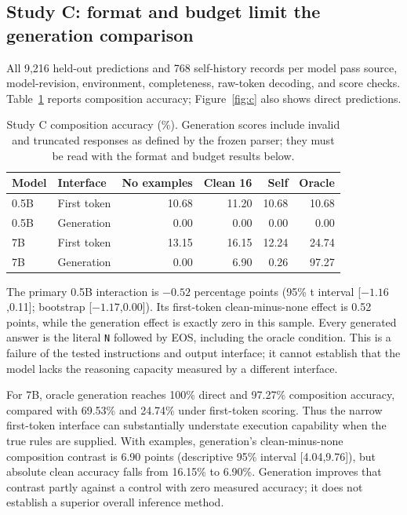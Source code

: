 \documentclass[11pt]{article}
\begin{document}
\subsection{Study C: format and budget limit the generation comparison}
All 9,216 held-out predictions and 768 self-history records per model pass
source, model-revision, environment, completeness, raw-token decoding, and
score checks. Table~\ref{tab:c} reports composition accuracy; Figure~\ref{fig:c}
also shows direct predictions.

\begin{table}[htbp]
\centering\small
\begin{tabular}{llrrrr}
\toprule
Model & Interface & No examples & Clean 16 & Self & Oracle \\
\midrule
0.5B & First token & 10.68 & 11.20 & 10.68 & 10.68 \\
0.5B & Generation & 0.00 & 0.00 & 0.00 & 0.00 \\
7B & First token & 13.15 & 16.15 & 12.24 & 24.74 \\
7B & Generation & 0.00 & 6.90 & 0.26 & 97.27 \\
\bottomrule
\end{tabular}
\caption{Study C composition accuracy (\%). Generation scores include invalid
and truncated responses as defined by the frozen parser; they must be read
with the format and budget results below.}
\label{tab:c}
\end{table}

The primary 0.5B interaction is $-0.52$ percentage points (95\% t interval
[$-1.16$,0.11]; bootstrap [$-1.17$,0.00]). Its first-token clean-minus-none
effect is 0.52 points, while the generation effect is exactly zero in this
sample. Every generated answer is the literal \texttt{N} followed by EOS,
including the oracle condition. This is a failure of the tested instructions
and output interface; it cannot establish that the model lacks the reasoning
capacity measured by a different interface.

For 7B, oracle generation reaches 100\% direct and 97.27\% composition
accuracy, compared with 69.53\% and 24.74\% under first-token scoring. Thus the
narrow first-token interface can substantially understate execution capability
when the true rules are supplied. With examples, generation's clean-minus-none
composition contrast is 6.90 points (descriptive 95\% interval [4.04,9.76]),
but absolute clean accuracy falls from 16.15\% to 6.90\%. Generation improves
that contrast partly against a control with zero measured accuracy; it does
not establish a superior overall inference method.
\end{document}
